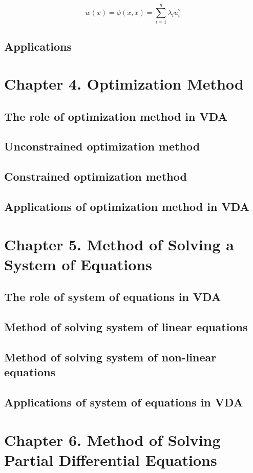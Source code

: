 \[
w(x) = \phi(x, x) = \sum_{i=1}^n \lambda_i u_i^2
\]

\subsection{Applications}

\section{Chapter 4. Optimization Method}
\subsection{The role of optimization method in VDA}
\subsection{Unconstrained optimization method}
\subsection{Constrained optimization method}
\subsection{Applications of optimization method in VDA}

\section{Chapter 5. Method of Solving a System of Equations}
\subsection{The role of system of equations in VDA}
\subsection{Method of solving system of linear equations}
\subsection{Method of solving system of non-linear equations}
\subsection{Applications of system of equations in VDA}

\section{Chapter 6. Method of Solving Partial Differential Equations}
